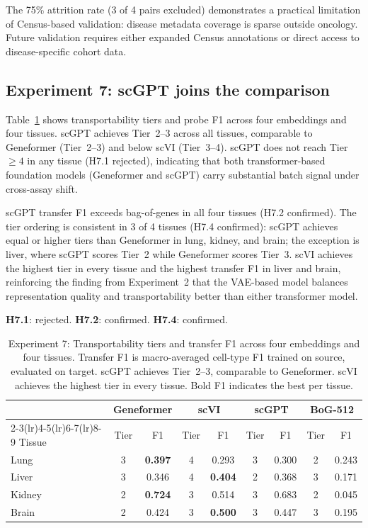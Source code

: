 \documentclass[11pt,letterpaper]{article}
\begin{document}
The 75\% attrition rate (3 of 4 pairs excluded) demonstrates a practical limitation of Census-based validation: disease metadata coverage is sparse outside oncology. Future validation requires either expanded Census annotations or direct access to disease-specific cohort data.

\subsection{Experiment 7: scGPT joins the comparison}

Table~\ref{tab:exp7} shows transportability tiers and probe F1 across four embeddings and four tissues. scGPT achieves Tier~2--3 across all tissues, comparable to Geneformer (Tier~2--3) and below scVI (Tier~3--4). scGPT does not reach Tier~$\geq 4$ in any tissue (H7.1 rejected), indicating that both transformer-based foundation models (Geneformer and scGPT) carry substantial batch signal under cross-assay shift.

scGPT transfer F1 exceeds bag-of-genes in all four tissues (H7.2 confirmed). The tier ordering is consistent in 3 of 4 tissues (H7.4 confirmed): scGPT achieves equal or higher tiers than Geneformer in lung, kidney, and brain; the exception is liver, where scGPT scores Tier~2 while Geneformer scores Tier~3. scVI achieves the highest tier in every tissue and the highest transfer F1 in liver and brain, reinforcing the finding from Experiment~2 that the VAE-based model balances representation quality and transportability better than either transformer model.

\textbf{H7.1}: rejected. \textbf{H7.2}: confirmed. \textbf{H7.4}: confirmed.

\begin{table}[t]
\centering
\caption{Experiment 7: Transportability tiers and transfer F1 across four embeddings and four tissues. Transfer F1 is macro-averaged cell-type F1 trained on source, evaluated on target. scGPT achieves Tier~2--3, comparable to Geneformer. scVI achieves the highest tier in every tissue. Bold F1 indicates the best per tissue.}
\label{tab:exp7}
\small
\begin{tabular}{@{}lcccccccc@{}}
\toprule
 & \multicolumn{2}{c}{Geneformer} & \multicolumn{2}{c}{scVI} & \multicolumn{2}{c}{scGPT} & \multicolumn{2}{c}{BoG-512} \\
\cmidrule(lr){2-3}\cmidrule(lr){4-5}\cmidrule(lr){6-7}\cmidrule(lr){8-9}
Tissue & Tier & F1 & Tier & F1 & Tier & F1 & Tier & F1 \\
\midrule
Lung   & 3 & \textbf{0.397} & 4 & 0.293 & 3 & 0.300 & 2 & 0.243 \\
Liver  & 3 & 0.346 & 4 & \textbf{0.404} & 2 & 0.368 & 3 & 0.171 \\
Kidney & 2 & \textbf{0.724} & 3 & 0.514 & 3 & 0.683 & 2 & 0.045 \\
Brain  & 2 & 0.424 & 3 & \textbf{0.500} & 3 & 0.447 & 3 & 0.195 \\
\bottomrule
\end{tabular}
\end{table}
\end{document}
